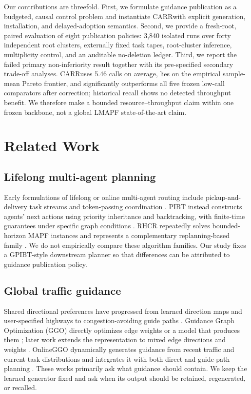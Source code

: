 \documentclass[sigconf,anonymous,review]{acmart}
\newcommand{\carr}{\textsc{CARR}}
\begin{document}
Our contributions are threefold. First, we formulate guidance publication as
a budgeted, causal control problem and instantiate \carr with explicit
generation, installation, and delayed-adoption semantics. Second, we provide a
fresh-root, paired evaluation of eight publication policies: 3{,}840 isolated
runs over forty independent root clusters, externally fixed task tapes,
root-cluster inference, multiplicity control, and an auditable no-deletion
ledger. Third, we report the failed primary non-inferiority result together
with its pre-specified secondary trade-off analyses. \carr uses 5.46 calls on
average, lies on the empirical sample-mean Pareto frontier, and significantly
outperforms all five frozen low-call comparators after correction; historical
recall shows no detected throughput benefit. We therefore make a bounded
resource--throughput claim within one frozen backbone, not a global LMAPF
state-of-the-art claim.

\section{Related Work}

\subsection{Lifelong multi-agent planning}

Early formulations of lifelong or online multi-agent routing include
pickup-and-delivery task streams and token-passing coordination
\cite{ma2017lifelong}. PIBT instead constructs agents' next actions using
priority inheritance and backtracking, with finite-time guarantees under
specific graph conditions \cite{ijcai2019p76}. RHCR repeatedly solves
bounded-horizon MAPF instances and represents a complementary replanning-based
family \cite{li2021rhcr}. We do not empirically compare these algorithm
families. Our study fixes a GPIBT-style downstream planner so that differences
can be attributed to guidance publication policy.

\subsection{Global traffic guidance}

Shared directional preferences have progressed from learned direction maps
and user-specified highways \cite{jansen2008direction,cohen2015highways} to
congestion-avoiding guide paths \cite{chen2024traffic}. Guidance Graph
Optimization (GGO) directly optimizes edge weights or a model that produces
them \cite{ijcai2024p0035}; later work extends the representation to mixed edge
directions and weights \cite{zhang2026mixed}. OnlineGGO dynamically generates
guidance from recent traffic and current task distributions and integrates it
with both direct and guide-path planning \cite{zang2025online}. These works
primarily ask what guidance should contain. We keep the learned generator
fixed and ask when its output should be retained, regenerated, or recalled.
\end{document}
